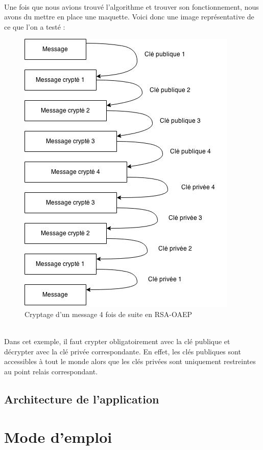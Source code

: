\documentclass[a4paper,12pt]{report}
\begin{document}
	\paragraph*{}
	Une fois que nous avions trouvé l'algorithme et trouver son fonctionnement, nous avons du mettre en place une maquette. Voici donc une image représentative de ce que l'on a testé :
	\begin{figure}[h] %
		\includegraphics[scale=0.70]{RSA.jpg}
		\caption{Cryptage d'un message 4 fois de suite en RSA-OAEP}
		\label{RSA}
	\end{figure}
	\\
	Dans cet exemple, il faut crypter obligatoirement avec la clé publique et décrypter avec la clé privée correspondante. En effet, les clés publiques sont accessibles à tout le monde alors que les clés privées sont uniquement restreintes au point relais correspondant.

	\subsection{Architecture de l'application}

\newpage	
\section{Mode d'emploi}
\end{document}
